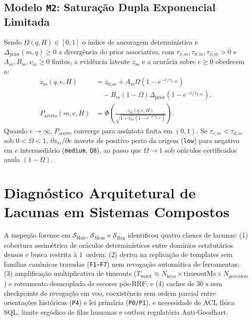 \documentclass[10pt,twocolumn]{article}
\begin{document}
\subsection{Modelo \texttt{M2}: Satura\c{c}\~ao Dupla Exponencial Limitada}

Sendo $\Omega(q,H) \in [0,1]$ o \'indice de ancoragem determin\'istica e $\Delta_{\mathrm{prior}}(m,q) \ge 0$ a diverg\^encia do prior associativo, com $\tau_{v,m},\tau_{d,m},\tau_{\nu,m} > 0$ e $A_m,B_m,\nu_m \ge 0$ finitos, a evid\^encia latente $z_m$ e a acur\'acia sobre $e \ge 0$ obedecem a:
\begin{align}
z_m(q,e,H) &= z_{0,m} + A_m\Omega\!\left(1 - e^{-e/\tau_{v,m}}\right) \nonumber\\
           &\quad - B_m(1-\Omega)\Delta_{\mathrm{prior}}\!\left(1 - e^{-e/\tau_{d,m}}\right), \\
P_{\mathrm{acerto}}(m,e,H) &= \Phi\!\left(\frac{z_m(q,e,H)}{\sqrt{1 + \nu_m(1 - e^{-e/\tau_{\nu,m}})}}\right).
\end{align}
Quando $e \to \infty$, $P_{\mathrm{acerto}}$ converge para ass\'intota finita em $(0,1)$. Se $\tau_{v,m} < \tau_{d,m}$ sob $0 < \Omega < 1$, $\partial z_m/\partial e$ inverte de positivo perto da origem (\texttt{low}) para negativo em $e$ intermedi\'ario (\texttt{medium}, \texttt{Q8}), ao passo que $\Omega \to 1$ sob or\'aculos certificados anula $(1-\Omega)$.

\section{Diagn\'ostico Arquitetural de Lacunas em Sistemas Compostos}

A inspe\c{c}\~ao forense em $\mathcal{S}_{\mathrm{Hub}}$, $\mathcal{S}_{\mathrm{Mem}}$ e $\mathcal{S}_{\mathrm{Reg}}$ identificou quatro classes de lacunas: (1) cobertura assim\'etrica de or\'aculos determin\'isticos entre dom\'inios estatut\'arios densos e busca restrita \`a 1\textordfeminine\ ordem; (2) deriva na replica\c{c}\~ao de templates sem fam\'ilias can\^onicas travadas (\texttt{F1--F7}) nem revoga\c{c}\~ao autom\'atica de ferramentas; (3) amplifica\c{c}\~ao multiplicativa de timeouts ($T_{\mathrm{worst}} \approx N_{\mathrm{keys}} \times \mathrm{timeoutMs} \times N_{\mathrm{providers}}$) e roteamento desacoplado de escores p\'os-RRF; e (4) caches de $30\text{ s}$ sem checkpoints de revoga\c{c}\~ao em voo, coexist\^encia sem ordem parcial entre orienta\c{c}\~oes hist\'oricas (\texttt{P4}) e lei prim\'aria (\texttt{P0/P1}), e necessidade de ACL f\'isica SQL, limite erg\'odico de filas humanas e outbox regulat\'oria Anti-Goodhart.
\end{document}
